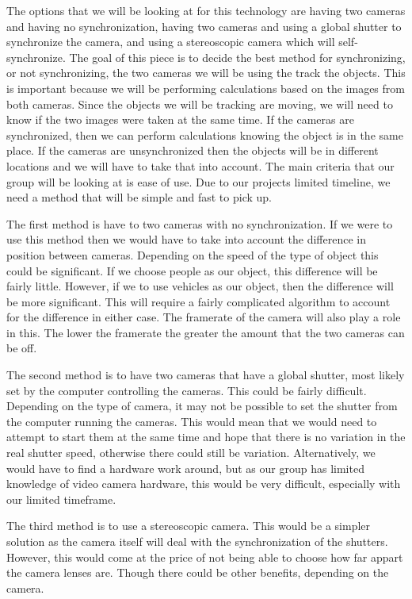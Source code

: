 \documentclass[letterpaper,10pt,onecolumn,draftclsnofoot]{IEEEtran}
\begin{document}
The options that we will be looking at for this technology are having two cameras and having no synchronization, having two cameras and using a global shutter to synchronize the camera, and using a stereoscopic camera which will self-synchronize.
The goal of this piece is to decide the best method for synchronizing, or not synchronizing, the two cameras we will be using the track the objects.
This is important because we will be performing calculations based on the images from both cameras. 
Since the objects we will be tracking are moving, we will need to know if the two images were taken at the same time.
If the cameras are synchronized, then we can perform calculations knowing the object is in the same place.
If the cameras are unsynchronized then the objects will be in different locations and we will have to take that into account.
The main criteria that our group will be looking at is ease of use.
Due to our projects limited timeline, we need a method that will be simple and fast to pick up.

The first method is have to two cameras with no synchronization.
If we were to use this method then we would have to take into account the difference in position between cameras.
Depending on the speed of the type of object this could be significant.
If we choose people as our object, this difference will be fairly little.
However, if we to use vehicles as our object, then the difference will be more significant.
This will require a fairly complicated algorithm to account for the difference in either case.
The framerate of the camera will also play a role in this.
The lower the framerate the greater the amount that the two cameras can be off.

The second method is to have two cameras that have a global shutter, most likely set by the computer controlling the cameras.
This could be fairly difficult.
Depending on the type of camera, it may not be possible to set the shutter from the computer running the cameras.
This would mean that we would need to attempt to start them at the same time and hope that there is no variation in the real shutter speed, otherwise there could still be variation.
Alternatively, we would have to find a hardware work around, but as our group has limited knowledge of video camera hardware, this would be very difficult, especially with our limited timeframe.

The third method is to use a stereoscopic camera.
This would be a simpler solution as the camera itself will deal with the synchronization of the shutters.
However, this would come at the price of not being able to choose how far appart the camera lenses are.
Though there could be other benefits, depending on the camera.
\end{document}
